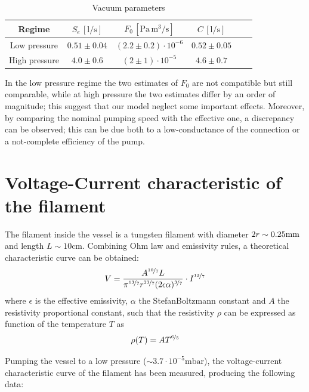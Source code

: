 \documentclass[11pt,a4 paper]{article}
\let\oldfrac\frac
\renewcommand{\frac}[3][d]{\ifthenelse{\equal{#1}{d}}{\oldfrac{#2}{#3}}{\nicefrac{#2}{#3}}}
\begin{document}

\begin{table}[H]
  \centering
  \begin{tabular}{cccccc}
    \toprule
    Regime & $S_e\,[\si{\litre\per\second}]$ & $F_0\,[\si{\pascal\,\metre^3\per\second}]$ & $C\,[\si{\litre\per\second}]$ \\
    \midrule
    Low pressure & $0.51 \pm 0.04$ & $(2.2 \pm 0.2)\cdot 10^{-6}$ & $0.52 \pm 0.05$ \\
    High pressure & $4.0 \pm 0.6$ & $(2 \pm 1)\cdot 10^{-5}$ & $4.6 \pm 0.7$ \\
    \bottomrule
  \end{tabular}
  \caption{Vacuum parameters}
  \label{tab:vacuum}
\end{table}

In the low pressure regime the two estimates of $F_0$ are not compatible but still comparable, while at high pressure the two estimates differ by an order of magnitude; this suggest that our model neglect some important effects. Moreover, by comparing the nominal pumping speed with the effective one, a discrepancy can be observed; this can be due both to a low-conductance of the connection or a not-complete efficiency of the pump.

\section{Voltage-Current characteristic of the filament}
The filament inside the vessel is a tungsten filament with diameter $2r\sim0.25\si{{\milli\metre}}$ and length $L\sim10\si{\centi\metre}$. Combining Ohm law and emissivity rules, a theoretical characteristic curve can be obtained:
\[
    V = \frac{A^{\frac[f]{10}{7}}L}{\pi^{\frac[f]{13}{7}}r^{\frac[f]{23}{7}}(2\epsilon\alpha)^{\frac[f]{3}{7}}} \cdot I^{\frac[f]{13}{7}}
\]
where $\epsilon$ is the effective emissivity, $\alpha$ the StefanBoltzmann constant and $A$ the resistivity proportional constant, such that the resistivity $\rho$ can be expressed as function of the temperature $T$ as
\[
    \rho(T) = AT^{\frac[f]{6}{5}}
\]

Pumping the vessel to a low pressure ($\sim 3.7\cdot10^{-5}\si{\milli\bar}$), the voltage-current characteristic curve of the filament has been measured, producing the following data:
\end{document}
